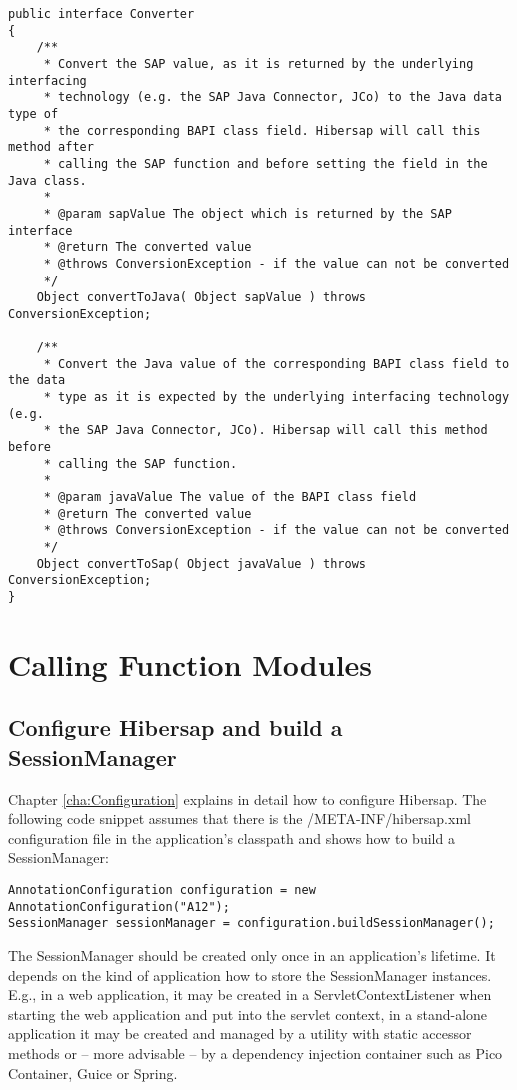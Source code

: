 \begin{Verbatim}[frame=single]
public interface Converter
{
    /**
     * Convert the SAP value, as it is returned by the underlying interfacing 
     * technology (e.g. the SAP Java Connector, JCo) to the Java data type of 
     * the corresponding BAPI class field. Hibersap will call this method after 
     * calling the SAP function and before setting the field in the Java class.
     * 
     * @param sapValue The object which is returned by the SAP interface
     * @return The converted value
     * @throws ConversionException - if the value can not be converted
     */
    Object convertToJava( Object sapValue ) throws ConversionException;

    /**
     * Convert the Java value of the corresponding BAPI class field to the data
     * type as it is expected by the underlying interfacing technology (e.g. 
     * the SAP Java Connector, JCo). Hibersap will call this method before 
     * calling the SAP function.
     * 
     * @param javaValue The value of the BAPI class field
     * @return The converted value
     * @throws ConversionException - if the value can not be converted
     */
    Object convertToSap( Object javaValue ) throws ConversionException;
}
\end{Verbatim}

\section{Calling Function Modules}

\subsection{Configure Hibersap and build a SessionManager}
Chapter \ref{cha:Configuration} explains in detail how to configure Hibersap. The following code snippet assumes that there is the /META-INF/hibersap.xml configuration file in the application's classpath and shows how to build a SessionManager:

\begin{Verbatim}[frame=single,label=Building the SessionManager]
AnnotationConfiguration configuration = new AnnotationConfiguration("A12"); 
SessionManager sessionManager = configuration.buildSessionManager();
\end{Verbatim}

The SessionManager should be created only once in an application's lifetime. It depends on the kind of application how to store the SessionManager instances. E.g., in a web application, it may be created in a ServletContextListener when starting the web application and put into the servlet context, in a stand-alone application it may be created and managed by a utility with static accessor methods or -- more advisable -- by a dependency injection container such as Pico Container, Guice or Spring.


